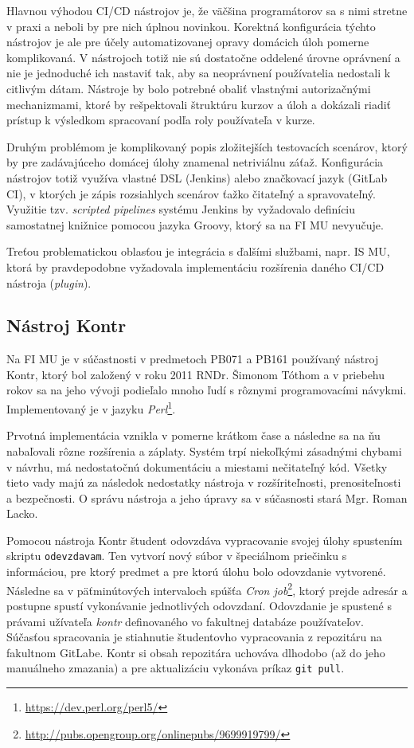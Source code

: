 \documentclass[
  digital, %
  oneside, %
  table,   %
  lof,     %
  lot,   %
]{fithesis3}
\begin{document}
Hlavnou výhodou CI/CD nástrojov je, že väčšina programátorov sa s nimi stretne v praxi a neboli by pre nich úplnou novinkou. Korektná konfigurácia týchto nástrojov je ale pre účely automatizovanej opravy domácich úloh pomerne komplikovaná. V nástrojoch totiž nie sú dostatočne oddelené úrovne oprávnení a nie je jednoduché ich nastaviť tak, aby sa neoprávnení používatelia nedostali k citlivým dátam. Nástroje by bolo potrebné obaliť vlastnými autorizačnými mechanizmami, ktoré by rešpektovali štruktúru kurzov a úloh a dokázali riadiť prístup k výsledkom spracovaní podľa roly používateľa v kurze.

Druhým problémom je komplikovaný popis zložitejších testovacích scenárov, ktorý by pre zadávajúceho domácej úlohy znamenal netriviálnu záťaž. Konfigurácia nástrojov totiž využíva vlastné DSL (Jenkins) alebo značkovací jazyk (GitLab CI), v ktorých je zápis rozsiahlych scenárov ťažko čitateľný a spravovateľný. Využitie tzv. \textit{scripted pipelines} systému Jenkins by vyžadovalo definíciu samostatnej knižnice pomocou jazyka Groovy, ktorý sa na FI MU nevyučuje.

Treťou problematickou oblasťou je integrácia s ďalšími službami, napr. IS MU, ktorá by pravdepodobne vyžadovala implementáciu rozšírenia daného CI/CD nástroja (\emph{plugin}).

\subsection{Nástroj Kontr}

Na FI MU je v súčastnosti v predmetoch PB071 a PB161 používaný nástroj Kontr, ktorý bol založený v roku 2011 RNDr. Šimonom Tóthom a v priebehu rokov sa na jeho vývoji podieľalo mnoho ľudí s rôznymi programovacími návykmi. Implementovaný je v jazyku \emph{Perl}\footnote{\url{https://dev.perl.org/perl5/}}.

Prvotná implementácia vznikla v pomerne krátkom čase a následne sa na ňu nabaľovali rôzne rozšírenia a záplaty. Systém trpí niekoľkými zásadnými chybami v návrhu, má nedostatočnú dokumentáciu a miestami nečitateľný kód. Všetky tieto vady majú za následok nedostatky nástroja v rozšíriteľnosti, prenositeľnosti a bezpečnosti. O správu nástroja a jeho úpravy sa v súčasnosti stará Mgr. Roman Lacko. 

Pomocou nástroja Kontr študent odovzdáva vypracovanie svojej úlohy spustením skriptu \texttt{odevzdavam}. Ten vytvorí nový súbor v špeciálnom priečinku s informáciou, pre ktorý predmet a pre ktorú úlohu bolo odovzdanie vytvorené. Následne sa v päťminútových intervaloch spúšťa \textit{Cron job}\footnote{\url{http://pubs.opengroup.org/onlinepubs/9699919799/}}, ktorý prejde adresár a postupne spustí vykonávanie jednotlivých odovzdaní. Odovzdanie je spustené s právami užívateľa \emph{kontr} definovaného vo fakultnej databáze používateľov. Súčasťou spracovania je stiahnutie študentovho vypracovania z repozitáru na fakultnom GitLabe. Kontr si obsah repozitára uchováva dlhodobo (až do jeho manuálneho zmazania) a pre aktualizáciu vykonáva príkaz \texttt{git pull}. 
\end{document}
